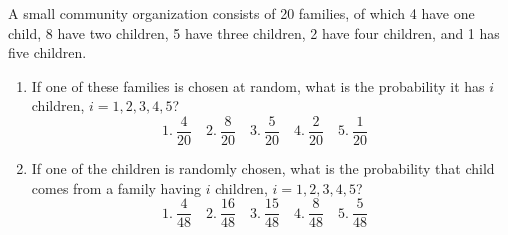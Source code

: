\item A small community organization consists of 20 families, of which 4 have one child, 8 have two children, 5 have three children, 2 have four children, and 1 has five children.


\begin{enumerate}
    \item If one of these families is chosen at random, what is the probability it has $i$ children, $i = 1,2,3,4,5$?
    \[ 1.\ \frac{4}{20} \quad 2.\ \frac{8}{20} \quad 3.\ \frac{5}{20} \quad 4.\ \frac{2}{20} \quad 5.\ \frac{1}{20} \quad \]
    \item If one of the children is randomly chosen, what is the probability that child comes from a family having $i$ children, $i = 1,2,3,4,5$?
    \[ 1.\ \frac{4}{48} \quad 2.\ \frac{16}{48} \quad 3.\ \frac{15}{48} \quad 4.\ \frac{8}{48} \quad 5.\ \frac{5}{48} \quad \]
\end{enumerate}